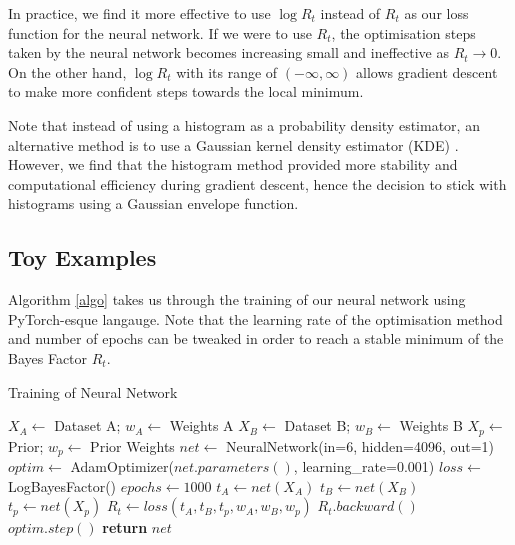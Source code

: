 \documentclass[%
 reprint,
 amsmath,amssymb,
 aps,
]{revtex4-2}
\begin{document}
In practice, we find it more effective to use $\log R_t$ instead of $R_t$ as our loss function for the neural network. If we were to use $R_t$, the optimisation steps taken by the neural network becomes increasing small and ineffective as $R_t \to 0$. On the other hand, $\log R_t$ with its range of $(-\infty, \infty)$ allows gradient descent to make more confident steps towards the local minimum.

Note that instead of using a histogram as a probability density estimator, an alternative method is to use a Gaussian kernel density estimator (KDE) \cite{Silverman1986}. However, we find that the histogram method provided more stability and computational efficiency during gradient descent, hence the decision to stick with histograms using a Gaussian envelope function.




\subsection{Toy Examples}

Algorithm \ref{algo} takes us through the training of our neural network using PyTorch-esque langauge. Note that the learning rate of the optimisation method and number of epochs can be tweaked in order to reach a stable minimum of the Bayes Factor $R_t$.
\begin{algorithm}[H]
\caption{Training of Neural Network}\label{algo}
    \begin{algorithmic}[1]
    \State $X_A \gets $ Dataset A; $w_A \gets $ Weights A 
    \State $X_B \gets $ Dataset B; $w_B \gets $ Weights B
    \State $X_p \gets $ Prior; $w_p \gets $ Prior Weights
    \State
    \State $net \gets $ NeuralNetwork(in=6, hidden=4096, out=1)
    \State $optim \gets $ AdamOptimizer($net.parameters()$, learning\_rate=0.001)
    \State $loss \gets $ LogBayesFactor()
    \State $epochs \gets 1000$
    \State
        \State $t_A \gets net(X_A)$ 
        \State $t_B \gets net(X_B)$
        \State $t_p \gets net(X_p)$
        \State
        \State $R_t \gets loss(t_A, t_B, t_p, w_A, w_B, w_p)$
        \State $R_t.backward()$ 
        \State $optim.step()$ 
    \EndFor
    \State
    \State \textbf{return} $net$
    \end{algorithmic}
\end{algorithm}
\end{document}
